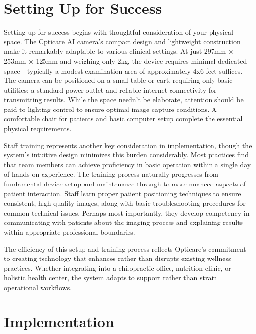 \documentclass[
  Letterpaper,
]{scrbook}
\begin{document}
\section{Setting Up for Success}\label{setting-up-for-success}

Setting up for success begins with thoughtful consideration of your
physical space. The Opticare AI camera's compact design and lightweight
construction make it remarkably adaptable to various clinical settings.
At just 297mm × 253mm × 125mm and weighing only 2kg, the device requires
minimal dedicated space - typically a modest examination area of
approximately 4x6 feet suffices. The camera can be positioned on a small
table or cart, requiring only basic utilities: a standard power outlet
and reliable internet connectivity for transmitting results. While the
space needn't be elaborate, attention should be paid to lighting control
to ensure optimal image capture conditions. A comfortable chair for
patients and basic computer setup complete the essential physical
requirements.

Staff training represents another key consideration in implementation,
though the system's intuitive design minimizes this burden considerably.
Most practices find that team members can achieve proficiency in basic
operation within a single day of hands-on experience. The training
process naturally progresses from fundamental device setup and
maintenance through to more nuanced aspects of patient interaction.
Staff learn proper patient positioning techniques to ensure consistent,
high-quality images, along with basic troubleshooting procedures for
common technical issues. Perhaps most importantly, they develop
competency in communicating with patients about the imaging process and
explaining results within appropriate professional boundaries.

The efficiency of this setup and training process reflects Opticare's
commitment to creating technology that enhances rather than disrupts
existing wellness practices. Whether integrating into a chiropractic
office, nutrition clinic, or holistic health center, the system adapts
to support rather than strain operational workflows.

\section{Implementation}\label{implementation}
\end{document}
